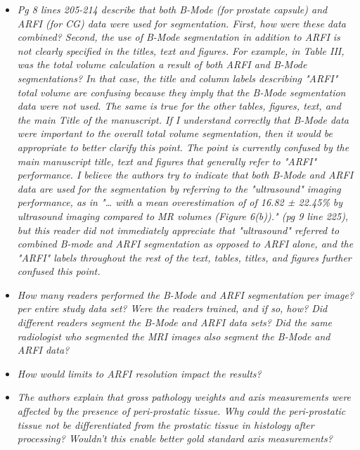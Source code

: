 \documentclass[10pt]{article}
\begin{document}
\begin{itemize}
    \item \textit{Pg 8 lines 205-214 describe that both B-Mode (for prostate
            capsule) and ARFI (for CG) data were used for segmentation.  First,
            how were these data combined?  Second, the use of B-Mode
            segmentation in addition to ARFI is not clearly specified in the
            titles, text and figures.  For example, in Table III, was the total
            volume calculation a result of both ARFI and B-Mode segmentations?
            In that case, the title and column labels describing "ARFI" total
            volume are confusing because they imply that the B-Mode
            segmentation data were not used.  The same is true for the other
            tables, figures, text, and the main Title of the manuscript.  If I
            understand correctly that B-Mode data were important to the overall
            total volume segmentation, then it would be appropriate to better
            clarify this point.  The point is currently confused by the main
            manuscript title, text and figures that generally refer to "ARFI"
            performance.  I believe the authors try to indicate that both
            B-Mode and ARFI data are used for the segmentation by referring to
            the "ultrasound" imaging performance, as in "… with a mean
            overestimation of of 16.82 ± 22.45\% by ultrasound imaging compared
            to MR volumes (Figure 6(b))." (pg 9 line 225), but this reader did
            not immediately appreciate that "ultrasound" referred to combined
            B-mode and ARFI segmentation as opposed to ARFI alone, and the
            "ARFI" labels throughout the rest of the text, tables, titles, and
            figures further confused this point.}

    \item \textit{How many readers performed the B-Mode and ARFI segmentation
            per image? per entire study data set? Were the readers trained, and
            if so, how?  Did different readers segment the B-Mode and ARFI data
            sets?  Did the same radiologist who segmented the MRI images also
            segment the B-Mode and ARFI data?}

    \item \textit{How would limits to ARFI resolution impact the results?}

    \item \textit{The authors explain that gross pathology weights and axis
            measurements were affected by the presence of peri-prostatic
            tissue.  Why could the peri-prostatic tissue not be differentiated
            from the prostatic tissue in histology after processing?  Wouldn't
            this enable better gold standard axis measurements?}


\end{itemize}
\end{document}
